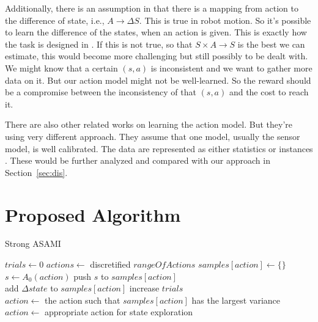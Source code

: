 \documentclass[10pt]{IEEEtran}
\begin{document}
Additionally, there is an assumption in \cite{CSJ06} that there is a
mapping from action to the difference of state, i.e., $A \rightarrow
\Delta S$.  This is true in robot motion. So it's possible to learn
the difference of the states, when an action is given. This is
exactly how the task is designed in \cite{ICDL10-hester}. If this is
not true, so that $S \times A \rightarrow S$ is the best we can
estimate, this would become more challenging but still possibly to be
dealt with. We might know that a certain $(s, a)$ is inconsistent and
we want to gather more data on it. But our action model might not be
well-learned. So the reward should be a compromise between the
inconsistency of that $(s, a)$ and the cost to reach it.

There are also other related works on learning the action model. But
they're using very different approach. They assume that one model,
usually the sensor model, is well calibrated. The data are represented
as either statistics \cite{And_learningand} or instances
\cite{LNAI2007-ahmadi}. These would be further analyzed and compared
with our approach in Section~\ref{sec:dis}.

\section{Proposed Algorithm}

\begin{algorithm*}
\caption{Strong ASAMI}\label{alg:asami}
\begin{algorithmic}[1]
    \State $trials\gets 0$
    \State $actions \gets$ discretified $rangeOfActions$
        \State $samples[action] \gets \{\}$ \label{asa:actInit}
        \State $s \gets A_0(action)$
	\State push $s$ to $samples[action]$
    \EndFor
\EndFunction
\\
 \label{asa:update}
    \State add $\Delta state$ to $samples[action]$
    \State increase $trials$
\EndFunction
\\
 \label{asa:getAct}
        \State $action \gets$ the action such that $samples[action]$ has the largest variance
    \Else
        \State $action \gets$ appropriate action for state exploration \label{asa:actSel2}
    \EndIf
\EndFunction
\end{algorithmic}
\end{algorithm*}
\end{document}
